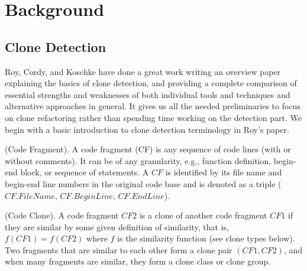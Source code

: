 \documentclass{acm_proc_article-sp}
\begin{document}
\section{Background}
\subsection{Clone Detection}
Roy, Cordy, and Koschke have done a great work \cite{roy2} writing an overview paper explaining the basics of clone detection, and providing a complete comparison of essential
strengths and weaknesses of both individual tools and techniques and alternative approaches in general. It gives us all the needed preliminaries to focus on clone refactoring rather
than spending time working on the detection part. We begin with a basic introduction to clone detection terminology in Roy's paper.

\begin{definition}
(Code Fragment). A code fragment (CF) is any sequence of code lines (with or without comments). It can be of any granularity, e.g., function
definition, begin-end block, or sequence of statements. A $CF$ is identified by its file name and begin-end line numbers in the original code base
and is denoted as a triple ($CF.FileName$, $CF.BeginLine$, $CF.EndLine$).
\end{definition}

\begin{definition}
(Code Clone). A code fragment $CF2$ is a clone of another code fragment $CF1$ if they are similar by some given definition of similarity, that is, 
$f(CF1) = f(CF2)$ where $f$ is the similarity function (see clone types below). Two fragments that are similar to each other form a clone pair
$(CF1, CF2)$, and when many fragments are similar, they form a clone class or clone group.
\end{definition}
\end{document}
